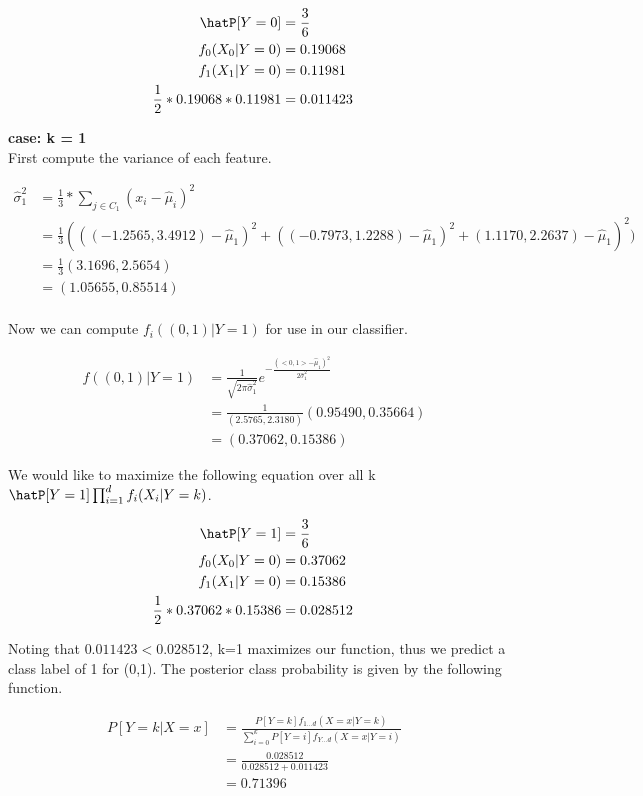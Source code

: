 \documentclass{jhwhw}
\newcommand{\Hat}[1]{\expandafter\hat#1}
\begin{document}
    \begin{align*}
	\Hat{P}[Y=0] &= \frac{3}{6} &\\
	f_0(X_0|Y=0) &= 0.19068 &\\
	f_1(X_1|Y=0) &= 0.11981 &\\
	\frac{1}{2}*0.19068*0.11981 &= 0.011423
    \end{align*}

    \bigbreak
    \textbf{case: k = 1} \\

    First compute the variance of each feature.

    \begin{align*}
	\Hat{\sigma}_1^2 &= \frac{1}{3} * \sum_{j\in C_1} (x_i - \Hat{\mu}_i)^2 &\\
	&= \frac{1}{3}(((-1.2565, 3.4912) - \Hat{\mu}_1) ^2 
	    + ((-0.7973, 1.2288) - \Hat{\mu}_1)^2 + (1.1170, 2.2637) - \Hat{\mu}_1)^2) &\\
	&= \frac{1}{3}(3.1696, 2.5654) &\\
	&= (1.05655, 0.85514) &\\
    \end{align*}

    Now we can compute $f_i((0,1)|Y=1)$ for use in our classifier.

    \begin{align*}
	f((0,1)|Y=1) &= \frac{1}{\sqrt{2\pi\Hat{\sigma}_1^2}}
	    e^{-\frac{(<0,1>-\Hat{\mu}_1)^2}{2\Hat{\sigma}_1^2}} &\\
	&= \frac{1}{(2.5765, 2.3180)} (0.95490, 0.35664) &\\
	&= (0.37062, 0.15386)
    \end{align*}

    We would like to maximize the following equation over all k
    $\Hat{P}[Y=1]\prod_{i=1}^{d}f_i(X_i|Y=k)$.

    \begin{align*}
	\Hat{P}[Y=1] &= \frac{3}{6} &\\
	f_0(X_0|Y=0) &= 0.37062 &\\
	f_1(X_1|Y=0) &= 0.15386 &\\
	\frac{1}{2}*0.37062*0.15386 &= 0.028512
    \end{align*}

    Noting that $0.011423 < 0.028512$, k=1 maximizes our function, thus we 
    predict a class label of 1 for (0,1).
    The posterior class probability is given by the following function.

    \begin{align*}
	P[Y=k|X=x] &= \frac{P[Y=k]f_{1\ldots d}(X=x|Y=k)}
	    {\sum_{i=0}^{k} P[Y=i]f_{Y\ldots d}(X=x|Y=i)} &\\
	&= \frac {0.028512} {0.028512 + 0.011423} &\\
	&= 0.71396
    \end{align*}
\end{document}
